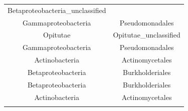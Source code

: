 \documentclass[]{article}
\begin{document}
\begin{longtable}[]{@{}cc@{}}
\begin{minipage}[t]{0.44\columnwidth}
Betaproteobacteria\_unclassified\strut
\end{minipage}\tabularnewline
\begin{minipage}[t]{0.39\columnwidth}\centering
Gammaproteobacteria\strut
\end{minipage} & \begin{minipage}[t]{0.44\columnwidth}\centering
Pseudomonadales\strut
\end{minipage}\tabularnewline
\begin{minipage}[t]{0.39\columnwidth}\centering
Opitutae\strut
\end{minipage} & \begin{minipage}[t]{0.44\columnwidth}\centering
Opitutae\_unclassified\strut
\end{minipage}\tabularnewline
\begin{minipage}[t]{0.39\columnwidth}\centering
Gammaproteobacteria\strut
\end{minipage} & \begin{minipage}[t]{0.44\columnwidth}\centering
Pseudomonadales\strut
\end{minipage}\tabularnewline
\begin{minipage}[t]{0.39\columnwidth}\centering
Actinobacteria\strut
\end{minipage} & \begin{minipage}[t]{0.44\columnwidth}\centering
Actinomycetales\strut
\end{minipage}\tabularnewline
\begin{minipage}[t]{0.39\columnwidth}\centering
Betaproteobacteria\strut
\end{minipage} & \begin{minipage}[t]{0.44\columnwidth}\centering
Burkholderiales\strut
\end{minipage}\tabularnewline
\begin{minipage}[t]{0.39\columnwidth}\centering
Betaproteobacteria\strut
\end{minipage} & \begin{minipage}[t]{0.44\columnwidth}\centering
Burkholderiales\strut
\end{minipage}\tabularnewline
\begin{minipage}[t]{0.39\columnwidth}\centering
Actinobacteria\strut
\end{minipage} & \begin{minipage}[t]{0.44\columnwidth}\centering
Actinomycetales\strut
\end{minipage}\tabularnewline
\begin{minipage}[t]{0.39\columnwidth}\centering

\end{minipage}
\end{longtable}
\end{document}
